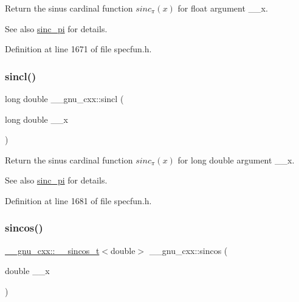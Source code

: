 Return the sinus cardinal function $ sinc_\pi(x) $ for {\ttfamily float} argument {\ttfamily \+\_\+\+\_\+x}.

\begin{DoxySeeAlso}{See also}
\hyperlink{group__mathsf__gnu_ga5195270024403b985e7d4f2f935f8779}{sinc\+\_\+pi} for details. 
\end{DoxySeeAlso}


Definition at line 1671 of file specfun.\+h.

\mbox{\label{group__mathsf__gnu_ga79a8fd931f5ad4f737e2931e636149ac}} 
\subsubsection{\texorpdfstring{sincl()}{sincl()}}
{\footnotesize\ttfamily long double \+\_\+\+\_\+gnu\+\_\+cxx\+::sincl (\begin{DoxyParamCaption}\item[{long double}]{\+\_\+\+\_\+x }\end{DoxyParamCaption})\hspace{0.3cm}{\ttfamily [inline]}}

Return the sinus cardinal function $ sinc_\pi(x) $ for {\ttfamily long double} argument {\ttfamily \+\_\+\+\_\+x}.

\begin{DoxySeeAlso}{See also}
\hyperlink{group__mathsf__gnu_ga5195270024403b985e7d4f2f935f8779}{sinc\+\_\+pi} for details. 
\end{DoxySeeAlso}


Definition at line 1681 of file specfun.\+h.

\mbox{\label{group__mathsf__gnu_ga8041c24b528475bcf8a4178e484652a3}} 
\subsubsection{\texorpdfstring{sincos()}{sincos()}\hspace{0.1cm}{\footnotesize\ttfamily [1/2]}}
{\footnotesize\ttfamily \hyperlink{struct____gnu__cxx_1_1____sincos__t}{\+\_\+\+\_\+gnu\+\_\+cxx\+::\+\_\+\+\_\+sincos\+\_\+t}$<$double$>$ \+\_\+\+\_\+gnu\+\_\+cxx\+::sincos (\begin{DoxyParamCaption}\item[{double}]{\+\_\+\+\_\+x }\end{DoxyParamCaption})\hspace{0.3cm}{\ttfamily [inline]}}

